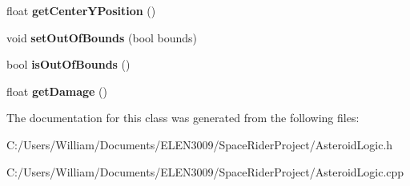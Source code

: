 \begin{DoxyCompactItemize}
float {\bfseries get\+Center\+Y\+Position} ()
\item 
\mbox{\label{class_asteroid_logic_ac9bfa7e9a3eed670f9264f15f395894e}} 
void {\bfseries set\+Out\+Of\+Bounds} (bool bounds)
\item 
\mbox{\label{class_asteroid_logic_ad2fadce802b18aa2d57baee65a56833e}} 
bool {\bfseries is\+Out\+Of\+Bounds} ()
\item 
\mbox{\label{class_asteroid_logic_abe3018168bb1a91b78aac410a3cb7853}} 
float {\bfseries get\+Damage} ()
\end{DoxyCompactItemize}


The documentation for this class was generated from the following files\+:\begin{DoxyCompactItemize}
\item 
C\+:/\+Users/\+William/\+Documents/\+E\+L\+E\+N3009/\+Space\+Rider\+Project/Asteroid\+Logic.\+h\item 
C\+:/\+Users/\+William/\+Documents/\+E\+L\+E\+N3009/\+Space\+Rider\+Project/Asteroid\+Logic.\+cpp\end{DoxyCompactItemize}
